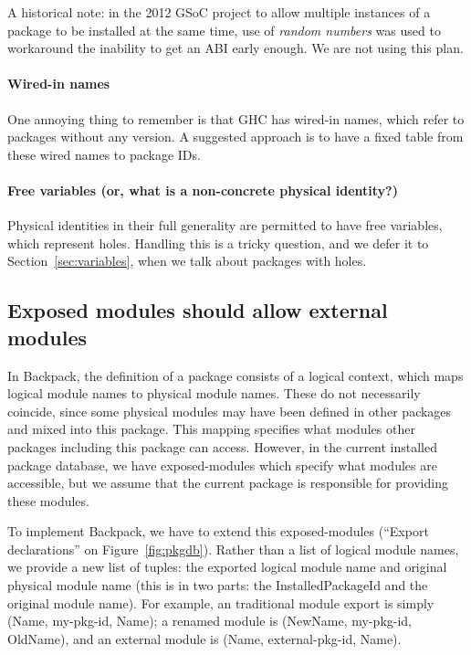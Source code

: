 \documentclass{article}
\begin{document}
A historical note: in the 2012 GSoC project to allow multiple instances
of a package to be installed at the same time, use of \emph{random
numbers} was used to workaround the inability to get an ABI early
enough.  We are not using this plan.

\paragraph{Wired-in names} One annoying thing to remember is that GHC
has wired-in names, which refer to packages without any version.  A
suggested approach is to have a fixed table from these wired names to
package IDs.

\paragraph{Free variables (or, what is a non-concrete physical
identity?)} Physical identities in their full generality are permitted
to have free variables, which represent holes.  Handling this is a
tricky question, and we defer it to Section~\ref{sec:variables}, when
we talk about packages with holes.

\subsection{Exposed modules should allow external modules}\label{sec:reexport}

In Backpack, the definition of a package consists of a logical context,
which maps logical module names to physical module names.  These do not
necessarily coincide, since some physical modules may have been defined
in other packages and mixed into this package.  This mapping specifies
what modules other packages including this package can access.
However, in the current installed package database, we have exposed-modules which
specify what modules are accessible, but we assume that the current
package is responsible for providing these modules.

To implement Backpack, we have to extend this exposed-modules (``Export declarations''
on Figure~\ref{fig:pkgdb}).  Rather
than a list of logical module names, we provide a new list of tuples:
the exported logical module name and original physical module name (this
is in two parts: the InstalledPackageId and the original module name).
For example, an traditional module export is simply (Name, my-pkg-id, Name);
a renamed module is (NewName, my-pkg-id, OldName), and an external module
is (Name, external-pkg-id, Name).
\end{document}

